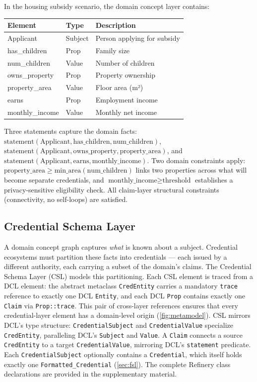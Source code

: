 In the housing subsidy scenario, the domain concept layer contains:

\begin{center}
\small
\begin{tabular}{lll}
\toprule
Element & Type & Description \\
\midrule
Applicant & Subject & Person applying for subsidy \\
has\_children & Prop & Family size \\
num\_children & Value & Number of children \\
owns\_property & Prop & Property ownership \\
property\_area & Value & Floor area (m²) \\
earns & Prop & Employment income \\
monthly\_income & Value & Monthly net income \\
\bottomrule
\end{tabular}
\end{center}

Three statements capture the domain facts: \(\text{statement}(\text{Applicant}, \text{has\_children}, \text{num\_children})\), \(\text{statement}(\text{Applicant}, \text{owns\_property}, \text{property\_area})\), and \(\text{statement}(\text{Applicant}, \text{earns}, \text{monthly\_income})\). Two domain constraints apply: \(\text{property\_area} \geq \text{min\_area}(\text{num\_children})\) links two properties across what will become separate credentials, and \(\text{monthly\_income} \geq \text{threshold}\) establishes a privacy-sensitive eligibility check. All claim-layer structural constraints (connectivity, no self-loops) are satisfied.

\subsection{Credential Schema Layer}\label{credential-schema-layer}

\label{sec:csl}

A domain concept graph captures \emph{what} is known about a subject. Credential ecosystems must partition these facts into credentials --- each issued by a different authority, each carrying a subset of the domain's claims. The Credential Schema Layer (CSL) models this partitioning. Each CSL element is traced from a DCL element: the abstract metaclass \texttt{CredEntity} carries a mandatory \texttt{trace} reference to exactly one DCL \texttt{Entity}, and each DCL \texttt{Prop} contains exactly one \texttt{Claim} via \texttt{Prop::trace}. This pair of cross-layer references ensures that every credential-layer element has a domain-level origin (\autoref{fig:metamodel}). CSL mirrors DCL's type structure: \texttt{CredentialSubject} and \texttt{CredentialValue} specialize \texttt{CredEntity}, paralleling DCL's \texttt{Subject} and \texttt{Value}. A \texttt{Claim} connects a source \texttt{CredEntity} to a target \texttt{CredentialValue}, mirroring DCL's \texttt{statement} predicate. Each \texttt{CredentialSubject} optionally contains a \texttt{Credential}, which itself holds exactly one \texttt{Formatted\_Credential} (\autoref{sec:fsl}). The complete Refinery class declarations are provided in the supplementary material.

